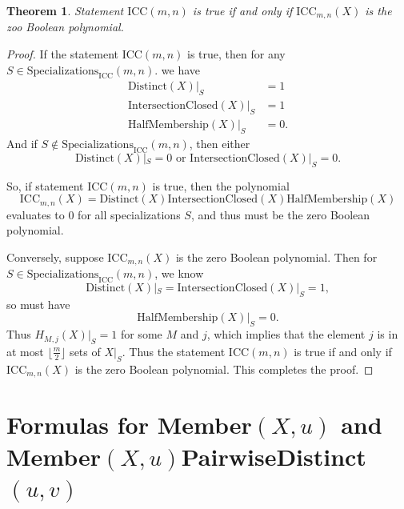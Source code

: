 \documentclass[11pt, oneside]{article}   	%
\newtheorem{theorem}{Theorem}
\begin{document}
\begin{theorem} 
Statement $\mathrm{ICC}(m,n)$ is true if and only if $\mathrm{ICC}_{m,n}(X)$ is the zoo Boolean polynomial. 
\end{theorem}
\begin{proof}
If the statement ICC$(m,n)$ is true, then for any $S \in \mathrm{Specializations}_{\mathrm{ICC}}(m,n)$. 
we have
$$
\begin{aligned} 
\mathrm{Distinct}(X)|_S&=1\\ 
\mathrm{IntersectionClosed}(X)|_S&=1 \\
\mathrm{HalfMembership}(X)|_S&=0.
\end{aligned}
$$
And if $S \notin \mathrm{Specializations}_{\mathrm{ICC}}(m,n)$, then either 
$$
\mathrm{Distinct}(X)|_S=0 \text{ or } \mathrm{IntersectionClosed}(X)|_S=0. 
$$

So, if statement ICC$(m,n)$ is true, then the polynomial
$$ \label{7}
\mathrm{ICC}_{m,n}(X) = \mathrm{Distinct}(X)
\mathrm{IntersectionClosed}(X)
\mathrm{HalfMembership}(X)
$$
evaluates to 0 for all specializations $S$, and thus must be the zero Boolean polynomial. 

Conversely, suppose $\mathrm{ICC}_{m,n}(X)$ is the zero Boolean polynomial. Then for $S \in \mathrm{Specializations}_{\mathrm{ICC}}(m,n)$, we know 
$$ \mathrm{Distinct}(X)|_S = 
\mathrm{IntersectionClosed}(X)|_S = 1,
$$ so must have 
$$\mathrm{HalfMembership}(X)|_S=0.$$ Thus $H_{M,j}(X)|_S=1$ for some $M$ and $j$, which implies that the element $j$ is in at most $\lfloor \frac{m}{2} \rfloor$ sets of $X|_S$. Thus the statement ICC$(m,n)$ is true if and only if $\mathrm{ICC}_{m,n}(X)$ is the zero Boolean polynomial. This completes the proof.
\end{proof}
\section{Formulas for Member$(X,u)$ and  \newline Member$(X,u)$PairwiseDistinct$(u,v)$}
\end{document}
